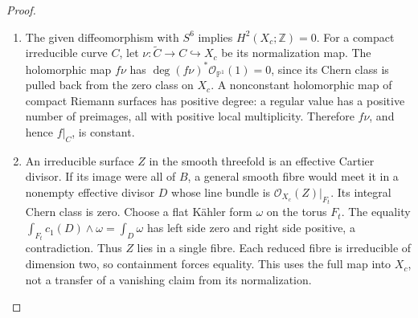 \begin{proof}
\begin{enumerate}[label=\arabic*.,leftmargin=*]
\item The given diffeomorphism with \(S^6\) implies \(H^2(X_c;\mathbb Z)=0\).
For a compact irreducible curve \(C\), let
\(\nu:\widetilde C\to C\hookrightarrow X_c\) be its normalization map.
The holomorphic map \(f\nu\) has
\(\deg (f\nu)^*\mathcal O_{\mathbb P^1}(1)=0\), since its Chern class is
pulled back from the zero class on \(X_c\). A nonconstant holomorphic map
of compact Riemann surfaces has positive degree: a regular value has a
positive number of preimages, all with positive local multiplicity.
Therefore \(f\nu\), and hence \(f|_C\), is constant.

\item An irreducible surface \(Z\) in the smooth threefold is an effective
Cartier divisor. If its image were all of \(B\), a general smooth fibre
would meet it in a nonempty effective divisor \(D\) whose line bundle
is \(\mathcal O_{X_c}(Z)|_{F_t}\). Its integral Chern class is zero.
Choose a flat K\"ahler form \(\omega\) on the torus \(F_t\). The equality
\(\int_{F_t}c_1(D)\wedge\omega=\int_D\omega\) has left side zero and right
side positive, a contradiction. Thus \(Z\) lies in a single fibre.
Each reduced fibre is irreducible of dimension two, so containment forces
equality. This uses the full map into \(X_c\), not a transfer of a
vanishing claim from its normalization.
\end{enumerate}
\end{proof}

